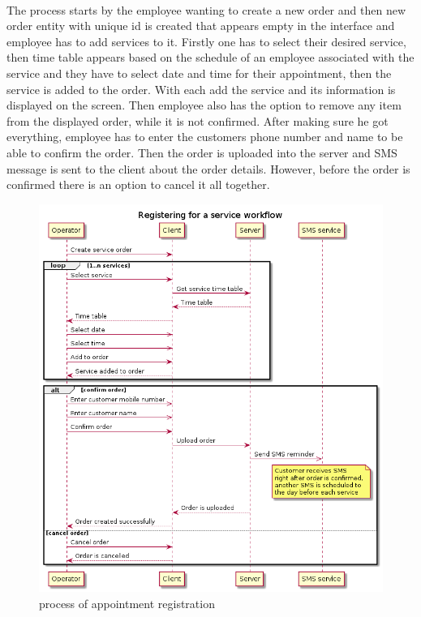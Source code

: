 \documentclass{article}
\begin{document}
    \paragraph{}The process starts by the employee wanting to create a new order and then new order entity with unique id is created that appears empty in the interface and employee has to add services to it. Firstly one has to select their desired service, then time table appears based on the schedule of an employee associated with the service and they have to select date and time for their appointment, then the service is added to the order. With each add the service and its information is displayed on the screen. Then employee also has the option to remove any item from the displayed order, while it is not confirmed. After making sure he got everything, employee has to enter the customers phone number and name to be able to confirm the order. Then the order is uploaded into the server and SMS message is sent to the client about the order details. However, before the order is confirmed there is an option to cancel it all together.
    \begin{figure}[H]
        \centering
        \includegraphics[width=0.9\linewidth]{PSP/lab-1/diagrams/sequence/service-order.png}
        \caption{process of appointment registration}
        \label{}
    \end{figure}
    
\end{document}
